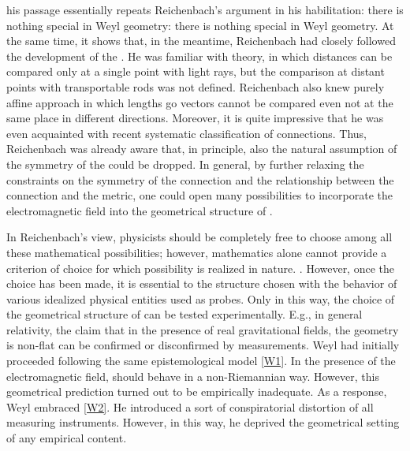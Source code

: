 \documentclass[draft]{article}
\newcommand{\WG}{Weyl geometry\xspace}
\begin{document}
%
his passage essentially repeats Reichenbach's argument in his habilitation: there is nothing special in Weyl geometry: there is nothing special in \WG. At the same time, it shows that, in the meantime, Reichenbach had closely followed the development of the \uftp. He was familiar with   theory, in which distances can be compared only at a single point with light rays, but the comparison at distant points with transportable rods was not defined. Reichenbach also knew  purely affine approach in which lengths go vectors cannot be compared even not at the same place in different directions. Moreover, it is quite impressive that he was even acquainted with  recent systematic classification of connections. Thus, Reichenbach was already aware that, in principle, also the natural assumption of the symmetry of the \Gtmn could be dropped. In general, by further relaxing the constraints on the symmetry of the connection and the relationship between the connection and the metric, one could open many possibilities to incorporate the electromagnetic field into the geometrical structure of \spti. 

In Reichenbach's view, physicists should be completely free to choose among all these mathematical possibilities; however, mathematics alone cannot provide a criterion of choice for which possibility is realized in nature. . However, once the choice has been made, it is essential to  the structure chosen with the behavior of various idealized physical entities used as probes. Only in this way, the choice of the geometrical structure of \spti can be tested experimentally. E.g., in general relativity, the claim that in the presence of real gravitational fields, the \spti geometry is non-flat can be confirmed or disconfirmed by \rach measurements. Weyl had initially proceeded following the same epistemological model \ref{W1}. In the presence of the electromagnetic field, \rac should behave in a non-Riemannian way. However, this geometrical prediction turned out to be empirically inadequate. As a response, Weyl embraced \ref{W2}. He introduced a sort of conspiratorial distortion of all measuring instruments. However, in this way, he deprived the geometrical setting of any empirical content. 
\end{document}
